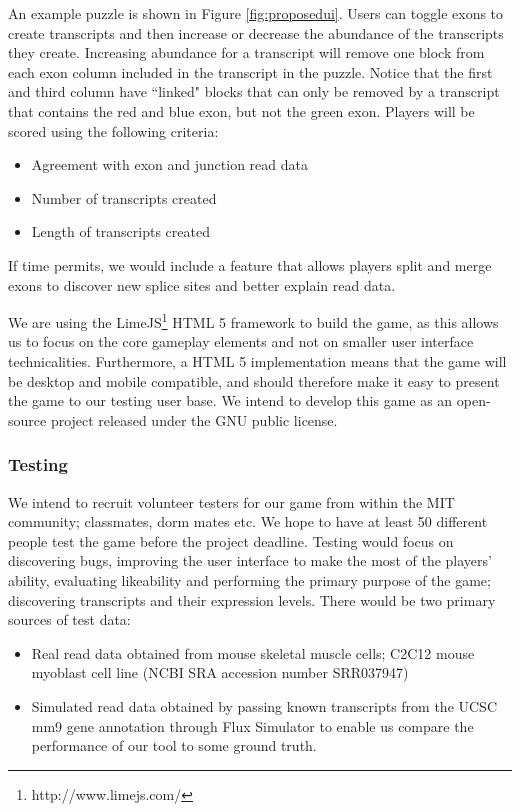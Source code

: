 \documentclass[12pt]{article}
\begin{document}
\begin{enumerate}
An example puzzle is shown in Figure \ref{fig:proposedui}. Users can toggle exons to create transcripts and then increase or decrease the abundance of the transcripts they create. Increasing abundance for a transcript
will remove one block from each exon column included in the transcript in the puzzle. Notice that the first and third column have ``linked" blocks that can only be removed by a transcript that contains the red and blue exon, but not the green exon. 
Players will be scored using the following criteria:
\begin{itemize}
\item Agreement with exon and junction read data
\item Number of transcripts created
\item Length of transcripts created
\end{itemize} 
If time permits, we would include a feature that allows players split and merge exons to discover new splice sites and better explain read data.
\end{enumerate}
We are using the LimeJS\footnote{http://www.limejs.com/} HTML 5 framework to build the game, as this allows us to focus on the core gameplay elements and not on smaller user interface technicalities. Furthermore, a HTML 5 implementation means that the game will be desktop and mobile compatible, and should therefore make it easy to present the game to our testing user base. We intend to develop this game as an open-source project released under the GNU public license.
\subsubsection*{Testing}
We intend to recruit volunteer testers for our game from within the MIT community; classmates, dorm mates etc. We hope to have at least 50 different people test the game before the project deadline. Testing would focus on discovering bugs, improving the user interface to make the most of the players' ability, evaluating likeability and performing the primary purpose of the game; discovering transcripts and their expression levels. There would be two primary sources of test data:
\begin{itemize}
\item Real read data obtained from mouse skeletal muscle cells; C2C12 mouse myoblast cell line (NCBI SRA accession number SRR037947) \citep{trapnell2010transcript}
\item Simulated read data obtained by passing known transcripts from the UCSC mm9 gene annotation \citep{karolchik2008ucsc} through Flux Simulator \citep{sammeth2010flux} to enable us compare the performance of our tool to some ground truth.
\end{itemize}
\end{document}
